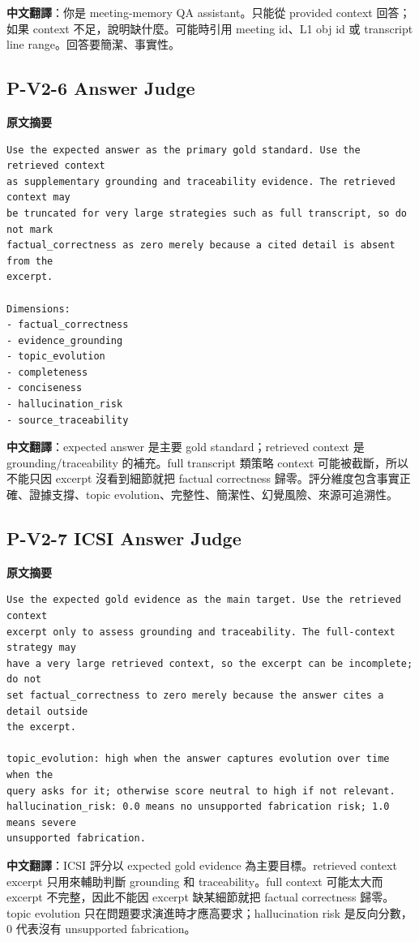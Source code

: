 \documentclass[11pt]{article}
\begin{document}
\textbf{中文翻譯}：你是 meeting-memory QA assistant。只能從 provided context 回答；如果 context 不足，說明缺什麼。可能時引用 meeting id、L1 obj id 或 transcript line range。回答要簡潔、事實性。

\subsection{P-V2-6 Answer Judge}

\textbf{原文摘要}
\begin{Verbatim}
Use the expected answer as the primary gold standard. Use the retrieved context
as supplementary grounding and traceability evidence. The retrieved context may
be truncated for very large strategies such as full transcript, so do not mark
factual_correctness as zero merely because a cited detail is absent from the
excerpt.

Dimensions:
- factual_correctness
- evidence_grounding
- topic_evolution
- completeness
- conciseness
- hallucination_risk
- source_traceability
\end{Verbatim}

\textbf{中文翻譯}：expected answer 是主要 gold standard；retrieved context 是 grounding/traceability 的補充。full transcript 類策略 context 可能被截斷，所以不能只因 excerpt 沒看到細節就把 factual correctness 歸零。評分維度包含事實正確、證據支撐、topic evolution、完整性、簡潔性、幻覺風險、來源可追溯性。

\subsection{P-V2-7 ICSI Answer Judge}

\textbf{原文摘要}
\begin{Verbatim}
Use the expected gold evidence as the main target. Use the retrieved context
excerpt only to assess grounding and traceability. The full-context strategy may
have a very large retrieved context, so the excerpt can be incomplete; do not
set factual_correctness to zero merely because the answer cites a detail outside
the excerpt.

topic_evolution: high when the answer captures evolution over time when the
query asks for it; otherwise score neutral to high if not relevant.
hallucination_risk: 0.0 means no unsupported fabrication risk; 1.0 means severe
unsupported fabrication.
\end{Verbatim}

\textbf{中文翻譯}：ICSI 評分以 expected gold evidence 為主要目標。retrieved context excerpt 只用來輔助判斷 grounding 和 traceability。full context 可能太大而 excerpt 不完整，因此不能因 excerpt 缺某細節就把 factual correctness 歸零。topic evolution 只在問題要求演進時才應高要求；hallucination risk 是反向分數，0 代表沒有 unsupported fabrication。
\end{document}
